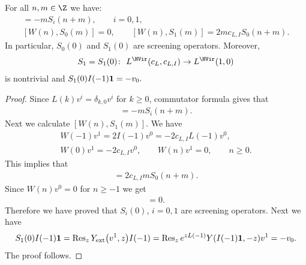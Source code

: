 \begin{Proposition}
For all $n,m\in \Z$ we have:
\begin{gather*}
[L(n), S_i (m)] = - m S_i (n+m), \qquad i=0,1,\\
[W(n), S_0 (m) ] = 0, \qquad [W(n), S_1(m) ] = 2 m c_{L,I} S_0( n+m).
\end{gather*}
In particular, $S_0 (0) $ and $S_1(0)$ are screening operators. Moreover,
\begin{gather*}
S_1= S_1(0) \colon \ L^{\HVir} (c_L, c_{L,I}) \rightarrow L^{\HVir} (1,0)
\end{gather*}
is nontrivial and $ S_1 (0) I(-1) {\bf 1} = - v_0. $
\end{Proposition}

\begin{proof} Since $L(k) v^{i} = \delta_{k,0} v^{i}$ for $k \ge 0$, commutator formula gives that
\begin{gather*}
[L(n), S_i(m)] = - m S_i (n+m).
\end{gather*}
Next we calculate $[W(n), S_1 (m)]$. We have
\begin{gather*}
W(-1) v^1 = 2 I(-1) v^0 = - 2 c_{L,I} L(-1) v^0, \\
W(0) v^1 = - 2 c_{L,I} v^ 0, \qquad W(n) v^1 = 0, \qquad n \ge 0.
\end{gather*}
This implies that
\begin{gather*}
[W(n), S_1 (m) ] = 2 c_{L,I} m S_0 (n+m).
\end{gather*}
Since $W(n) v^0 = 0$ for $n \ge -1$ we get
\begin{gather*}
[ W(n), S_0 (m) ] = 0.
\end{gather*}
Therefore we have proved that $S_i(0)$, $i= 0,1$ are screening operators. Next we have
\begin{gather*}
S_1(0) I(-1) {\bf 1} = \operatorname{Res}_z Y_{\rm ext}\big(v^1, z\big) I(-1) = \operatorname{Res}_z e ^{z L(-1)} Y( I(-1) {\bf 1}
,- z) v^1 = - v_0.
\end{gather*}
The proof follows.
\end{proof}

